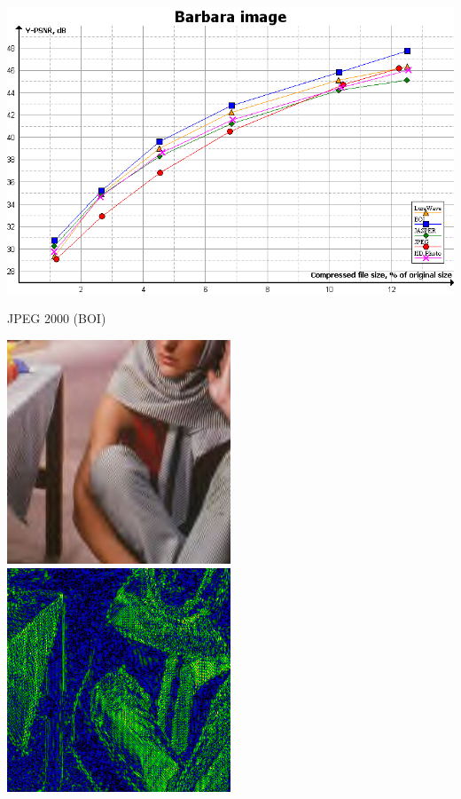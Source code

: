 \documentclass{beamer}
\begin{document}
  \begin{frame}
    \includegraphics[width=\textwidth]{figure/barbara_psnr.png}
  \end{frame}
  \begin{frame}{JPEG 2000 (BOI)}
    \begin{multicols}{2}
      \includegraphics[width=0.5\textwidth]{figure/BOI_barbara010.jpg}
      \includegraphics[width=0.5\textwidth]{figure/psnr_BOI_barbara010.png}
    \end{multicols}
  \end{frame}
\end{document}
